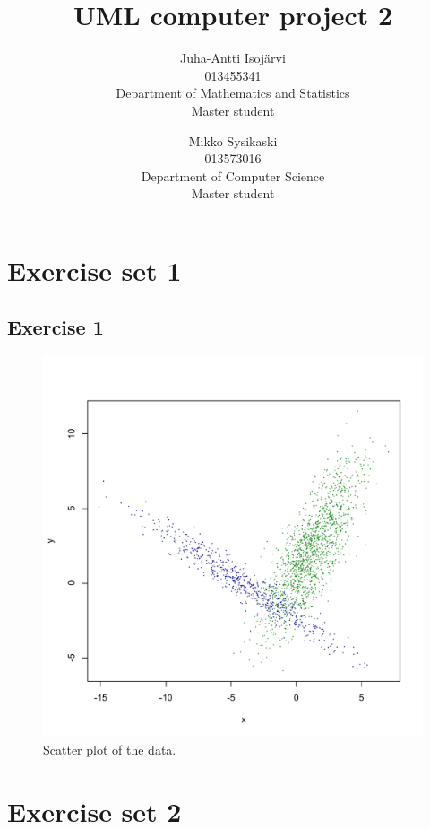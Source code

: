 \documentclass{article}
\begin{document}
\title{UML computer project 2}
\author{
Juha-Antti Isojärvi\\
013455341 \\
Department of Mathematics and Statistics\\
Master student
\and
Mikko Sysikaski\\
013573016\\
Department of Computer Science\\
Master student}
\date{}
\maketitle

\section{Exercise set 1}
\subsection{Exercise 1}
\begin{figure}\centering
	\includegraphics[totalheight=0.5\textheight]{scatterE31.pdf}
	\caption{Scatter plot of the data.} \label{fig:scatterE31}
\end{figure}

\section{Exercise set 2}
\end{document}

